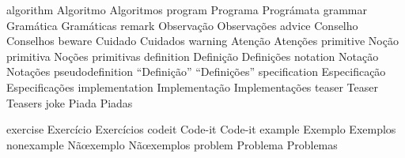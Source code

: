 \DefWords algorithm         {Algoritmo} {Algoritmos}
\DefWords program           {Programa} {Prográmata}
\DefWords grammar           {Gramática} {Gramáticas}
\DefWords remark            {Observação} {Observações}
\DefWords advice            {Conselho} {Conselhos}
\DefWords beware            {Cuidado} {Cuidados}
\DefWords warning           {Atenção} {Atenções}
\DefWords primitive         {Noção primitiva} {Noções primitivas}
\DefWords definition        {Definição} {Definições}
\DefWords notation          {Notação} {Notações}
\DefWords pseudodefinition  {``Definição''} {``Definições''}
\DefWords specification     {Especificação} {Especificações}
\DefWords implementation    {Implementação} {Implementações}
\DefWords teaser            {Teaser} {Teasers}
\DefWords joke              {Piada} {Piadas}

\DefWords exercise          {Exercício} {Exercícios}
\DefWords codeit            {Code-it} {Code-it}
\DefWords example           {Exemplo} {Exemplos}
\DefWords nonexample        {Nãœxemplo} {Nãœxemplos}
\DefWords problem           {Problema} {Problemas}


